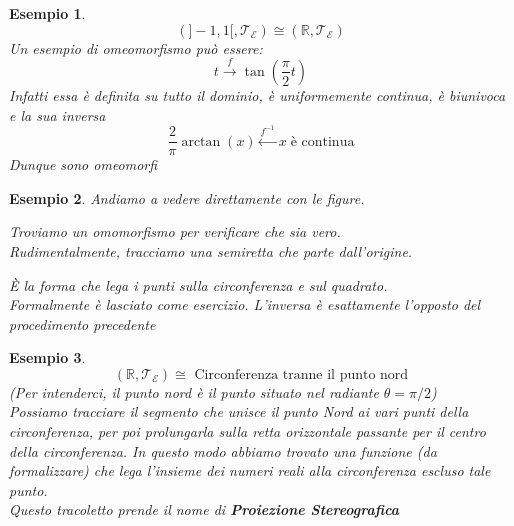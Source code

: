\documentclass[11pt,a4paper,twoside]{article}
\newtheorem{es}{Esempio}
\theoremstyle{definition}
\begin{document}
\begin{es}
	\[ (]-1,1[, \mathcal T_\mathcal E) \cong (\mathbb R, \mathcal T_\mathcal E)\]
	Un esempio di omeomorfismo può essere:
	\[ t \xrightarrow{f} \tan\left(\frac \pi 2 t\right) \]
	Infatti essa è definita su tutto il dominio, è uniformemente continua, è biunivoca e la sua inversa
	\[ \frac 2 \pi \arctan(x) \xleftarrow{f^{-1}} x \; \text{è continua}\]
	Dunque sono omeomorfi
\end{es}

\begin{es}
	Andiamo a vedere direttamente con le figure.
	\begin{center}
	\end{center}

	Troviamo un omomorfismo per verificare che sia vero.\\
	Rudimentalmente, tracciamo una semiretta che parte dall'origine.

	\begin{center}

	\end{center}
	È la forma che lega i punti sulla circonferenza e sul quadrato.\\
	Formalmente è lasciato come esercizio. L'inversa è esattamente l'opposto del procedimento precedente
\end{es}

\newpage

\begin{es}
	\[(\mathbb R, \mathcal T_\mathcal E) \cong \text{ Circonferenza tranne il punto nord}\]
	(Per intenderci, il punto nord è il punto situato nel radiante $\theta = \pi/2$)\\
	Possiamo tracciare il segmento che unisce il punto Nord ai vari punti della circonferenza, per poi prolungarla sulla retta orizzontale passante per il centro della circonferenza. In questo modo abbiamo trovato una funzione (da formalizzare) che lega l'insieme dei numeri reali alla circonferenza escluso tale punto. \\
	Questo tracoletto prende il nome di \textbf{Proiezione Stereografica}
	\begin{center}
	\end{center}
\end{es}
\end{document}
